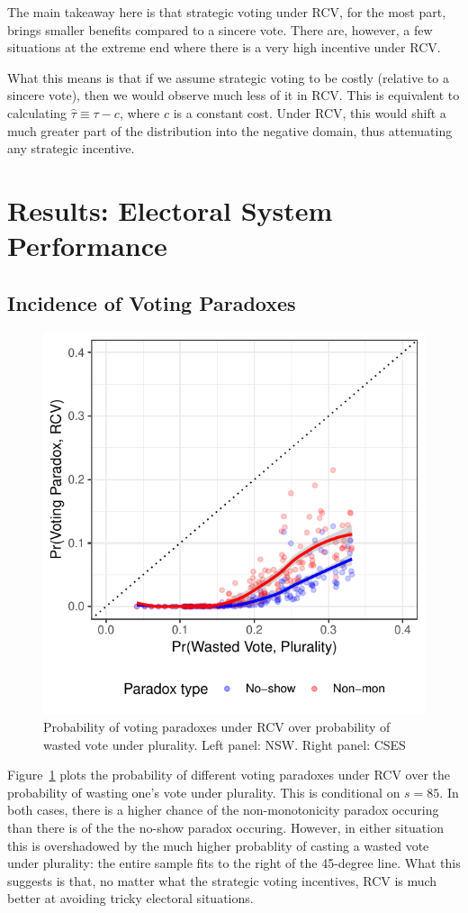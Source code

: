 \documentclass[12pt, letter, margin = 1.5 in]{article}
\begin{document}
The main takeaway here is that strategic voting under RCV, for the most part, brings smaller benefits compared to a sincere vote. There are, however, a few situations at the extreme end where there is a very high incentive under RCV.

What this means is that if we assume strategic voting to be costly (relative to a sincere vote), then we would observe much less of it in RCV. This is equivalent to calculating $\hat{\tau} \equiv \tau - c$, where $c$ is a constant cost. Under RCV, this would shift a much greater part of the distribution into the negative domain, thus attenuating any strategic incentive.

\section{Results: Electoral System Performance}
\subsection{Incidence of Voting Paradoxes}

\begin{figure}[!h]
	\centering
	\includegraphics[width = .6 \textwidth]{"../output/figures/paradoxes_cses"}
	\caption{Probability of voting paradoxes under RCV over probability of wasted vote under plurality. Left panel: NSW. Right panel: CSES}
	\label{fig:paradox}
\end{figure}

Figure~\ref{fig:paradox} plots the probability of different voting paradoxes under RCV over the probability of wasting one's vote under plurality. This is conditional on $s = 85$. In both cases, there is a higher chance of the non-monotonicity paradox occuring than there is of the the no-show paradox occuring. However, in either situation this is overshadowed by the much higher probablity of casting a wasted vote under plurality: the entire sample fits to the right of the 45-degree line. What this suggests is that, no matter what the strategic voting incentives, RCV is much better at avoiding tricky electoral situations.
\end{document}
